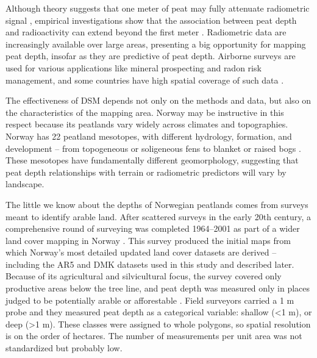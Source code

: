 \documentclass[soil, manuscript]{copernicus}
\begin{document}
Although theory suggests that one meter of peat may fully attenuate radiometric signal \citep{beamishGammaRayAttenuation2013, reinhardtGammaraySpectrometryVersatile2019}, empirical investigations show that the association between peat depth and radioactivity can extend beyond the first meter \citep{keaneySpatialStatisticsEstimate2013, gatisMappingUplandPeat2019, kogantiMappingPeatDepth2023}.
Radiometric data are increasingly available over large areas, presenting a big opportunity for mapping peat depth, insofar as they are predictive of peat depth.
Airborne surveys are used for various applications like mineral prospecting and radon risk management, and some countries have high spatial coverage of such data \citep{minasnyDigitalMappingPeatlands2019, baranwalAirborneGeophysicalSurveys2020}.

The effectiveness of DSM depends not only on the methods and data, but also on the characteristics of the mapping area.
Norway may be instructive in this respect because its peatlands vary widely across climates and topographies.
Norway has 22 peatland mesotopes, with different hydrology, formation, and development -- from topogeneous or soligeneous fens to blanket or raised bogs \citep{joostenWiseUseMires2002, lyngstadBeskrivelserAvTorvmassivenheter2023}.
These mesotopes have fundamentally different geomorphology, suggesting that peat depth relationships with terrain or radiometric predictors will vary by landscape.

The little we know about the depths of Norwegian peatlands comes from surveys meant to identify arable land.
After scattered surveys in the early 20th century, a comprehensive round of surveying was completed 1964--2001 as part of a wider land cover mapping in Norway \citep{bjordalMarkslagsklassifikasjonOkonomiskKartverk2007}.
This survey produced the initial maps from which Norway's most detailed updated land cover datasets are derived -- including the AR5 and DMK datasets used in this study and described later.
Because of its agricultural and silvicultural focus, the survey covered only productive areas below the tree line, and peat depth was measured only in places judged to be potentially arable or afforestable \citep{ahlstromAR5Klassifikasjonssystem2019}.
Field surveyors carried a 1 m probe and they measured peat depth as a categorical variable: shallow (\textless1 m), or deep (\textgreater1 m).
These classes were assigned to whole polygons, so spatial resolution is on the order of hectares.
The number of measurements per unit area was not standardized but probably low.
\end{document}
